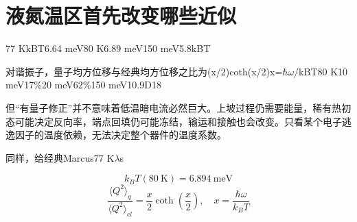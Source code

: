 \documentclass[11pt,a4paper]{article}
\begin{document}
\section{{\cjkfont 液氮温区首先改变哪些近似}\allowbreak{}}\label{sec:40}
77 K\allowbreak{}kBT\allowbreak{}6.64 meV\allowbreak{}80 K\allowbreak{}6.89 meV\allowbreak{}150 meV\allowbreak{}5.8kBT\allowbreak{}
\par
{\cjkfont 对谐振子，量子均方位移与经典均方位移之比为}\allowbreak{}(x/2)coth(x/2)\allowbreak{}x=\allowbreak{}\ensuremath{\hbar}\ensuremath{\omega}/kBT\allowbreak{}80 K\allowbreak{}10 meV\allowbreak{}17\%\allowbreak{}20 meV\allowbreak{}62\%\allowbreak{}150 meV\allowbreak{}10.9\allowbreak{}D18\allowbreak{}
\par
{\cjkfont 但“有量子修正”并不意味着低温暗电流必然巨大。上坡过程仍需要能量，稀有热初态可能决定反向率，端点回填仍可能冻结，输运和接触也会改变。只看某个电子逃逸因子的温度依赖，无法决定整个器件的温度系数。}\allowbreak{}
\par
{\cjkfont 同样，给经典}\allowbreak{}Marcus\allowbreak{}77 K\allowbreak{}\ensuremath{\lambda}s\allowbreak{}
\par
\begin{equation}
k_BT(80\ \mathrm{K})=6.894\ \mathrm{meV}
\label{eq:45}\end{equation}
\begin{equation}
\frac{\langle Q^2\rangle_q}{\langle Q^2\rangle_{cl}}=\frac{x}{2}\coth\!\left(\frac{x}{2}\right),\quad x=\frac{\hbar\omega}{k_BT}
\label{eq:46}\end{equation}
\end{document}
